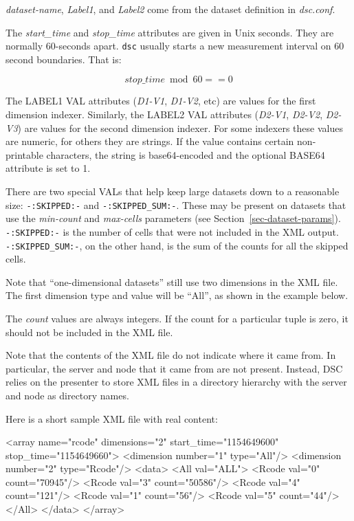 \documentclass{report}
\begin{document}
\noindent
{\em dataset-name\/},
{\em Label1\/}, and
{\em Label2\/} come from the dataset definition in {\em dsc.conf\/}.

The {\em start\_time\/} and {\em stop\_time\/} attributes
are given in Unix seconds.  They are normally 60-seconds apart.
{\tt dsc} usually starts a new measurement interval on 60 second
boundaries. That is:

\begin{equation}
stop\_time \bmod{60} == 0
\end{equation}

The LABEL1 VAL attributes ({\em D1-V1\/}, {\em D1-V2\/}, etc) are
values for the first dimension indexer.  
Similarly, the LABEL2 VAL attributes ({\em D2-V1\/}, {\em D2-V2\/},
{\em D2-V3\/}) are values for the second dimension indexer.
For some indexers these
values are numeric, for others they are strings.  If the value
contains certain non-printable characters, the string is base64-encoded
and the optional BASE64 attribute is set to 1.

There are two special VALs that help keep large datasets down
to a reasonable size: {\tt -:SKIPPED:-\/}  and {\tt -:SKIPPED\_SUM:-\/}.
These may be present on datasets that use the {\em min-count\/}
and {\em max-cells\/} parameters (see Section~\ref{sec-dataset-params}).
{\tt -:SKIPPED:-\/} is the number of cells that were not included
in the XML output.  {\tt -:SKIPPED\_SUM:-\/}, on the other hand, is the
sum of the counts for all the skipped cells.

Note that ``one-dimensional datasets'' still use two dimensions in
the XML file.  The first dimension type and value will be ``All'',
as shown in the example below.

The {\em count\/} values are always integers.  If the count for
a particular tuple is zero, it should not be included in the
XML file.

Note that the contents of the XML file do not indicate
where it came from.  In particular, the server and node that
it came from are not present.  Instead, DSC relies on the
presenter to store XML files in a directory hierarchy
with the server and node as directory names.


\noindent
Here is a short sample XML file with real content:
\begin{MyVerbatim}
<array name="rcode" dimensions="2" start_time="1154649600"
        stop_time="1154649660">
  <dimension number="1" type="All"/>
  <dimension number="2" type="Rcode"/>
  <data>
    <All val="ALL">
      <Rcode val="0" count="70945"/>
      <Rcode val="3" count="50586"/>
      <Rcode val="4" count="121"/>
      <Rcode val="1" count="56"/>
      <Rcode val="5" count="44"/>
    </All>
  </data>
</array>
\end{MyVerbatim}
\end{document}
